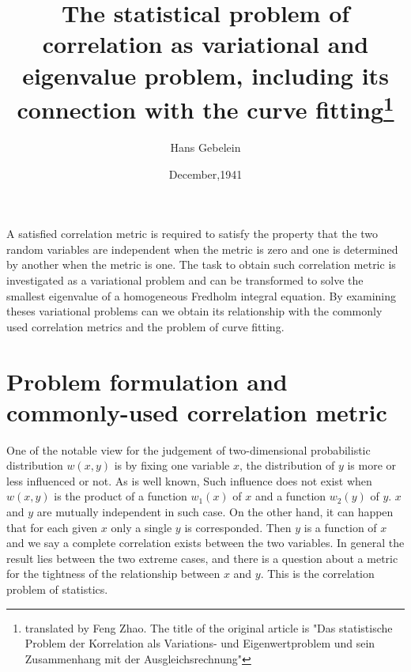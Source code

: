 \documentclass{article}
\title{The statistical problem of correlation as variational and eigenvalue problem, including its connection with the curve fitting\footnote{translated by Feng Zhao. The title of the original article is "Das statistische Problem der Korrelation als Variations- und Eigenwertproblem und sein Zusammenhang mit der Ausgleichsrechnung"}}
\date{December,1941}
\author{Hans Gebelein}
\begin{document}
\maketitle
\begin{centering}
A satisfied correlation metric is required to satisfy
the property that the two random variables are independent when the metric is zero and one is
determined by another when the metric is one.
The task to obtain such correlation metric is investigated
as a variational problem and can be transformed to solve
the smallest eigenvalue of a homogeneous Fredholm integral equation. By examining theses variational
problems can we obtain its relationship with the commonly used correlation metrics and the problem of curve fitting.
\end{centering}

\section{Problem formulation and commonly-used correlation metric}
One of the notable view for the judgement of two-dimensional probabilistic distribution $w(x,y)$ is by fixing one variable $x$, the distribution of $y$ is more or less influenced or not. As is well known,
Such influence does not exist when $w(x,y)$
is the product of a function $w_1(x)$ of $x$ and
a function $w_2(y)$ of $y$. $x$ and $y$
are mutually independent in such case. On the
other hand, it can happen that for each given $x$
only a single $y$ is corresponded. Then $y$
is a function of $x$ and we say a complete correlation
exists between the two variables. In general the result lies between the two extreme cases, and there is a question about a metric for the tightness of the relationship
between $x$ and $y$. This is the correlation problem of statistics.
\end{document}
